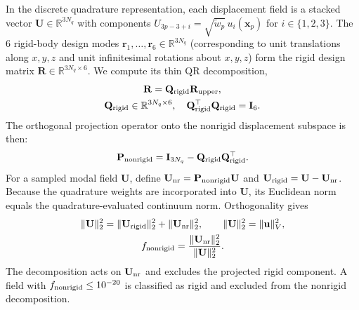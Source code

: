 \documentclass[pdflatex,sn-basic]{sn-jnl}
\begin{document}
In the discrete quadrature representation, each displacement field is a stacked vector $\mathbf U \in \mathbb{R}^{3N_q}$ with components $U_{3p-3+i} = \sqrt{\tilde w_p} \, u_i(\mathbf x_p)$ for $i \in \{1,2,3\}$.
The 6 rigid-body design modes $\mathbf r_1, \dots, \mathbf r_6 \in \mathbb{R}^{3N_q}$ (corresponding to unit translations along $x,y,z$ and unit infinitesimal rotations about $x,y,z$) form the rigid design matrix $\mathbf R \in \mathbb{R}^{3N_q \times 6}$.
We compute its thin QR decomposition,
\begin{equation}
\begin{gathered}
\mathbf R = \mathbf Q_{\rm rigid} \mathbf R_{\rm upper}, \\
 \mathbf Q_{\rm rigid} \in \mathbb{R}^{3N_q \times 6}, \quad \mathbf Q_{\rm rigid}^\top \mathbf Q_{\rm rigid} = \mathbf I_6.
\end{gathered}
\end{equation}
The orthogonal projection operator onto the nonrigid displacement subspace is then:
\begin{equation}
\mathbf P_{\rm nonrigid} = \mathbf I_{3N_q} - \mathbf Q_{\rm rigid} \mathbf Q_{\rm rigid}^\top.
\label{eq:nonrigid-proj}
\end{equation}
For a sampled modal field $\mathbf U$, define $\mathbf U_{\rm nr}=\mathbf P_{\rm nonrigid}\mathbf U$ and $\mathbf U_{\rm rigid}=\mathbf U-\mathbf U_{\rm nr}$. Because the quadrature weights are incorporated into $\mathbf U$, its Euclidean norm equals the quadrature-evaluated continuum norm. Orthogonality gives
\begin{equation}
\begin{gathered}
\|\mathbf U\|_2^2=\|\mathbf U_{\rm rigid}\|_2^2+\|\mathbf U_{\rm nr}\|_2^2,\qquad\|\mathbf U\|_2^2=\|\mathbf u\|_V^2,\\
f_{\rm nonrigid}=\frac{\|\mathbf U_{\rm nr}\|_2^2}{\|\mathbf U\|_2^2}.
\end{gathered}
\end{equation}
The decomposition acts on $\mathbf U_{\rm nr}$ and excludes the projected rigid component. A field with $f_{\rm nonrigid}\le10^{-20}$ is classified as rigid and excluded from the nonrigid decomposition.
\end{document}
